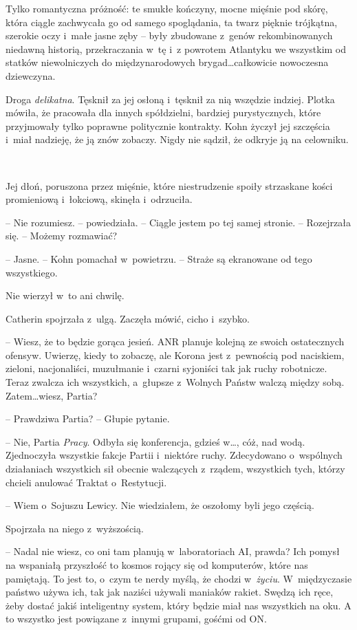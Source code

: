 \documentclass[oneside,polish,11pt,sfheadings]{mwbk}
\begin{document}
Tylko romantyczna próżność: te
smukłe kończyny, mocne mięśnie pod skórę, która ciągle zachwycała go od
samego spoglądania, ta twarz pięknie trójkątna, szerokie oczy i~małe
jasne zęby -- były zbudowane z~genów rekombinowanych niedawną historią,
przekraczania w~tę i~z powrotem Atlantyku we wszystkim od statków
niewolniczych do międzynarodowych brygad\ldots całkowicie nowoczesna
dziewczyna.

Droga \emph{delikatna}. Tęsknił za jej osłoną i~tęsknił za nią wszędzie
indziej. Plotka mówiła, że pracowała dla innych spółdzielni, bardziej
purystycznych, które przyjmowały tylko poprawne politycznie kontrakty.
Kohn życzył jej szczęścia i~miał nadzieję, że ją znów zobaczy. Nigdy nie
sądził, że odkryje ją na celowniku.

~

Jej dłoń, poruszona przez mięśnie, które niestrudzenie spoiły strzaskane
kości promieniową i~łokciową, skinęła i~odrzuciła.

-- Nie rozumiesz. -- powiedziała. -- Ciągle jestem po tej samej stronie. --
Rozejrzała się. -- Możemy rozmawiać?

-- Jasne. -- Kohn pomachał w~powietrzu. -- Straże są ekranowane od tego
wszystkiego.

Nie wierzył w~to ani chwilę.

Catherin spojrzała z~ulgą. Zaczęła mówić, cicho i~szybko.

-- Wiesz, że to będzie gorąca jesień. ANR planuje kolejną ze swoich
ostatecznych ofensyw. Uwierzę, kiedy to zobaczę, ale Korona jest z~pewnością pod naciskiem, zieloni, nacjonaliści, muzułmanie i~czarni
syjoniści tak jak ruchy robotnicze. Teraz zwalcza ich wszystkich, a~głupsze z~Wolnych Państw walczą między sobą. Zatem\ldots wiesz, Partia?

-- Prawdziwa Partia? -- Głupie pytanie.

-- Nie, Partia \emph{Pracy}. Odbyła się konferencja, gdzieś w\ldots, cóż,
nad wodą. Zjednoczyła wszystkie fakcje Partii i~niektóre ruchy.
Zdecydowano o~wspólnych działaniach wszystkich sił obecnie walczących z~rządem, wszystkich tych, którzy chcieli anulować Traktat o~Restytucji.

-- Wiem o~Sojuszu Lewicy. Nie wiedziałem, że oszołomy byli jego częścią.

Spojrzała na niego z~wyższością.

-- Nadal nie wiesz, co oni tam planują w~laboratoriach AI, prawda? Ich
pomysł na wspaniałą przyszłość to kosmos rojący się od komputerów, które
nas pamiętają. To jest to, o~czym te nerdy myślą, że chodzi w~\emph{życiu}. W~międzyczasie państwo używa ich, tak jak naziści używali
maniaków rakiet. Swędzą ich ręce, żeby dostać jakiś inteligentny system,
który będzie miał nas wszystkich na oku. A to wszystko jest powiązane z~innymi grupami, gośćmi od ON.
\end{document}
